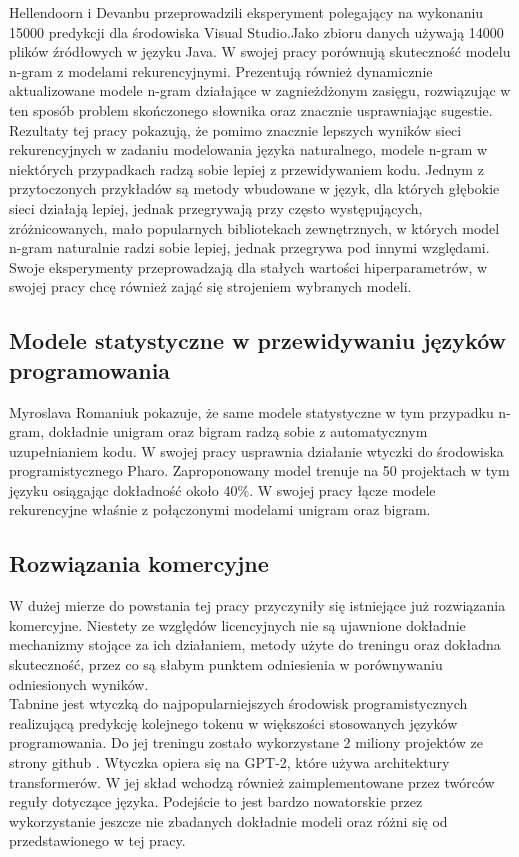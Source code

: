 Hellendoorn i Devanbu przeprowadzili eksperyment polegający na wykonaniu 15000 predykcji dla 
środowiska Visual Studio.Jako zbioru danych używają 14000 plików źródłowych w języku Java. 
W swojej pracy porównują skuteczność modelu n-gram z modelami rekurencyjnymi. 
Prezentują również dynamicznie aktualizowane modele n-gram działające w zagnieżdżonym zasięgu, rozwiązując 
w ten sposób problem skończonego słownika oraz znacznie usprawniając sugestie. Rezultaty tej pracy 
pokazują, że pomimo znacznie lepszych wyników sieci rekurencyjnych w zadaniu modelowania języka 
naturalnego, modele n-gram w niektórych przypadkach radzą sobie lepiej z przewidywaniem kodu. Jednym
z przytoczonych przykładów są metody wbudowane w język, dla których głębokie sieci działają lepiej, 
jednak przegrywają przy często występujących, zróżnicowanych,  mało popularnych bibliotekach zewnętrznych, 
w których model n-gram naturalnie radzi sobie lepiej, jednak przegrywa pod innymi względami. Swoje 
eksperymenty przeprowadzają dla stałych wartości hiperparametrów, w swojej pracy chcę również
zająć się strojeniem wybranych modeli. 


\subsection {Modele statystyczne w przewidywaniu języków programowania}
Myroslava Romaniuk \cite{pharo} pokazuje, że same modele statystyczne w tym przypadku n-gram, dokładnie 
unigram oraz bigram radzą sobie 
z automatycznym uzupełnianiem kodu. W swojej pracy usprawnia działanie wtyczki do środowiska programistycznego 
Pharo. Zaproponowany model trenuje na 50 projektach w tym języku osiągając dokładność około 40\%. 
W swojej pracy łącze modele rekurencyjne właśnie z połączonymi modelami unigram oraz bigram.

\subsection {Rozwiązania komercyjne}
W dużej mierze do powstania tej pracy przyczyniły się istniejące już rozwiązania komercyjne. Niestety 
ze względów licencyjnych nie są ujawnione dokładnie mechanizmy stojące za ich działaniem, metody użyte 
do treningu oraz dokładna skuteczność, przez co są słabym punktem odniesienia w porównywaniu odniesionych 
wyników. \\

Tabnine \cite{tabnine} jest wtyczką do najpopularniejszych środowisk programistycznych realizującą predykcję kolejnego tokenu w 
większości stosowanych języków programowania. Do jej treningu zostało wykorzystane 2 miliony projektów ze strony github \cite{github}. 
Wtyczka opiera się na GPT-2, które używa architektury transformerów. W jej skład wchodzą również zaimplementowane przez twórców
reguły dotyczące języka. Podejście to jest bardzo nowatorskie przez wykorzystanie jeszcze nie zbadanych dokładnie modeli oraz 
różni się od przedstawionego w tej pracy.\\

